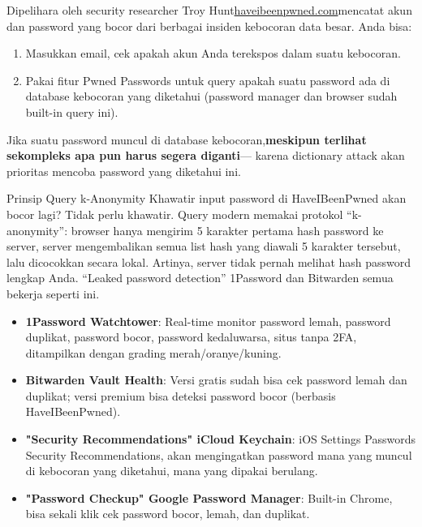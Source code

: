 Dipelihara oleh security researcher Troy Hunt\href{https://haveibeenpwned.com}{haveibeenpwned.com}mencatat akun dan password yang bocor dari berbagai insiden kebocoran data besar. Anda bisa:

\begin{enumerate}
  \item Masukkan email, cek apakah akun Anda terekspos dalam suatu kebocoran.
  \item Pakai fitur Pwned Passwords untuk query apakah suatu password ada di database kebocoran yang diketahui (password manager dan browser sudah built-in query ini).
\end{enumerate}

Jika suatu password muncul di database kebocoran,\textbf{meskipun terlihat sekompleks apa pun harus segera diganti}— karena dictionary attack akan prioritas mencoba password yang diketahui ini.

\begin{tcbinfo}{Prinsip Query k-Anonymity}
Khawatir input password di HaveIBeenPwned akan bocor lagi? Tidak perlu khawatir. Query modern memakai protokol “k-anonymity”: browser hanya mengirim 5 karakter pertama hash password ke server, server mengembalikan semua list hash yang diawali 5 karakter tersebut, lalu dicocokkan secara lokal. Artinya, server tidak pernah melihat hash password lengkap Anda. “Leaked password detection” 1Password dan Bitwarden semua bekerja seperti ini.

\end{tcbinfo}


\begin{itemize}
  \item \textbf{1Password Watchtower}: Real-time monitor password lemah, password duplikat, password bocor, password kedaluwarsa, situs tanpa 2FA, ditampilkan dengan grading merah/oranye/kuning.
  \item \textbf{Bitwarden Vault Health}: Versi gratis sudah bisa cek password lemah dan duplikat; versi premium bisa deteksi password bocor (berbasis HaveIBeenPwned).
  \item \textbf{"Security Recommendations" iCloud Keychain}: iOS Settings Passwords Security Recommendations, akan mengingatkan password mana yang muncul di kebocoran yang diketahui, mana yang dipakai berulang.
  \item \textbf{"Password Checkup" Google Password Manager}: Built-in Chrome, bisa sekali klik cek password bocor, lemah, dan duplikat.
\end{itemize}

